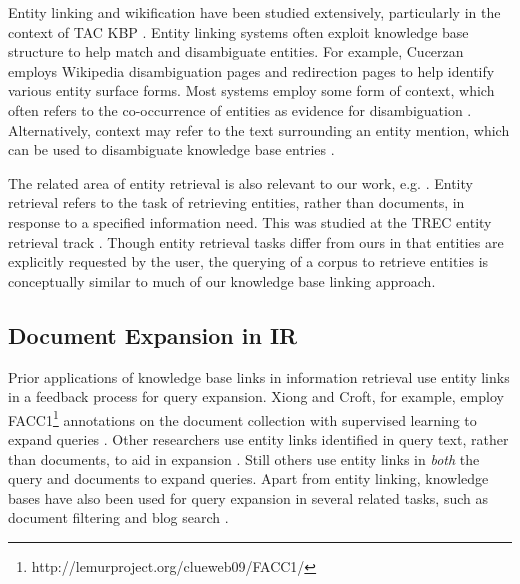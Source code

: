 \documentclass{sig-alternate}
\begin{document}
Entity linking and wikification have been studied extensively, particularly in the context of TAC KBP \cite{Ji2014}. Entity linking systems often exploit knowledge base structure to help match and disambiguate entities. For example, Cucerzan \cite{Cucerzan2007} employs Wikipedia disambiguation pages and redirection pages to help identify various entity surface forms. Most systems employ some form of context, which often refers to the co-occurrence of entities as evidence for disambiguation \cite{Stoyanov2012, Dalton2013}. Alternatively, context may refer to the text surrounding an entity mention, which can be used to disambiguate knowledge base entries \cite{Mihalcea2007, Dalton2013}.

The related area of entity retrieval is also relevant to our work, e.g. \cite{Adafre2007, Bron2010}. Entity retrieval refers to the task of retrieving entities, rather than documents, in response to a specified information need. This was studied at the TREC entity retrieval track \cite{Balog2011}. Though entity retrieval tasks differ from ours in that entities are explicitly requested by the user, the querying of a corpus to retrieve entities is conceptually similar to much of our knowledge base linking approach.

\subsection{Document Expansion in IR}\label{section.related.ir}

Prior applications of knowledge base links in information retrieval use entity links in a feedback process for query expansion. Xiong and Croft, for example, employ FACC1\footnote{http://lemurproject.org/clueweb09/FACC1/} annotations on the document collection with supervised learning to expand queries \cite{Xiong2015}. Other researchers use entity links identified in query text, rather than documents, to aid in expansion \cite{Xu2009, Brandao2014}. Still others use entity links in \textit{both} the query and documents \cite{Dalton2014, Li2015} to expand queries. Apart from entity linking, knowledge bases have also been used for query expansion in several related tasks, such as document filtering \cite{Xie2015} and blog search \cite{Elsas2008, Weerkamp2009}.
\end{document}
